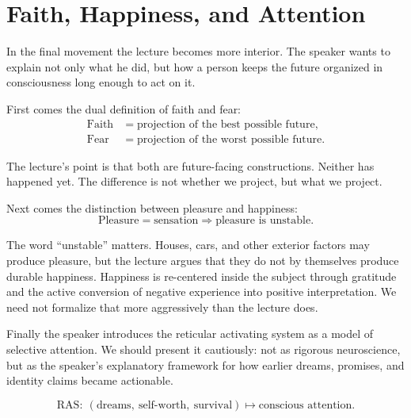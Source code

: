 \section{Faith, Happiness, and Attention}

In the final movement the lecture becomes more interior. The speaker wants to explain not only what he did, but how a person keeps the future organized in consciousness long enough to act on it.

First comes the dual definition of faith and fear:
\begin{align}
\text{Faith} &= \text{projection of the best possible future},\\
\text{Fear} &= \text{projection of the worst possible future}.
\end{align}

The lecture's point is that both are future-facing constructions. Neither has happened yet. The difference is not whether we project, but what we project.

Next comes the distinction between pleasure and happiness:
\begin{equation}
\text{Pleasure} = \text{sensation}
\Longrightarrow
\text{pleasure is unstable}.
\end{equation}

The word ``unstable'' matters. Houses, cars, and other exterior factors may produce pleasure, but the lecture argues that they do not by themselves produce durable happiness. Happiness is re-centered inside the subject through gratitude and the active conversion of negative experience into positive interpretation. We need not formalize that more aggressively than the lecture does.

Finally the speaker introduces the reticular activating system as a model of selective attention. We should present it cautiously: not as rigorous neuroscience, but as the speaker's explanatory framework for how earlier dreams, promises, and identity claims became actionable.

\begin{equation}
\mathrm{RAS}:\ (\text{dreams},\ \text{self-worth},\ \text{survival})
\longmapsto
\text{conscious attention}.
\end{equation}

\begin{figure}
\centering
{}
\end{figure}

